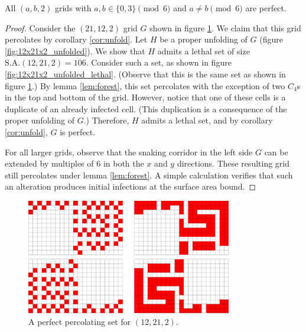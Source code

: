 \begin{con}
All $(a,b,2)$ grids with $a,b \in \{0,3\} \pmod 6$ and $a \neq b \pmod 6$ are perfect. 
\end{con}

\begin{proof}
Consider the $(21,12,2)$ grid $G$ shown in figure \ref{fig:12x21x2}. We claim that this grid percolates by corollary \ref{cor:unfold}. Let $H$ be a proper unfolding of $G$ (figure \ref{fig:12x21x2_unfolded}). We show that $H$ admits a lethal set of size $\text{S.A.}(12,21,2) = 106$. Consider such a set, as shown in figure \ref{fig:12x21x2_unfolded_lethal}. (Observe that this is the same set as shown in figure \ref{fig:12x21x2}.) By lemma \ref{lem:forest}, this set percolates with the exception of two $C_4$s in the top and bottom of the grid. However, notice that one of these cells is a duplicate of an already infected cell. (This duplication is a consequence of the proper unfolding of $G$.) Therefore, $H$ admits a lethal set, and by corollary \ref{cor:unfold}, $G$ is perfect.

For all larger grids, observe that the snaking corridor in the left side $G$ can be extended by multiples of 6 in both the $x$ and $y$ directions. These resulting grid still percolates under lemma \ref{lem:forest}. A simple calculation verifies that such an alteration produces initial infections at the surface area bound. 
\end{proof}

\begin{figure}[]
\centering
\includegraphics[width=0.8\textwidth]{figures/4/12x21x2.pdf}
\caption{A perfect percolating set for $(12,21,2)$.}
\label{fig:12x21x2}
\end{figure} 

